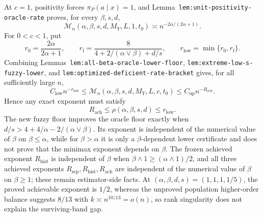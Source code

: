 At \(c=1\), positivity forces \(\pi_P(a\mid x)=1\), and Lemma~\texttt{lem:unit-positivity-oracle-rate} proves, for every \(\beta,s,d\),
\[
\mathcal M_n(\alpha,\beta,s,d,M_Y,L,1,t_0)
\asymp n^{-2\alpha/(2\alpha+1)}.
\]
For \(0<c<1\), put
\[
r_0=\frac{2\alpha}{2\alpha+1},
\qquad
r_{\mathrm f}=\frac{8}{4+2/(\alpha\vee\beta)+d/s},
\qquad
r_{\mathrm{low}}=\min\{r_0,r_{\mathrm f}\}.
\]
Combining Lemmas~\texttt{lem:all-beta-oracle-lower-floor}, \texttt{lem:extreme-low-s-fuzzy-lower}, and \texttt{lem:optimized-deficient-rate-bracket} gives, for all sufficiently large \(n\),
\[
C_{\mathrm{low}}n^{-r_{\mathrm{low}}}
\le
\mathcal M_n(\alpha,\beta,s,d,M_Y,L,c,t_0)
\le
C_{\mathrm{up}}n^{-R_{\mathrm{ach}}}.
\]
Hence any exact exponent must satisfy
\[
R_{\mathrm{ach}}
\le \rho(\alpha,\beta,s,d)
\le r_{\mathrm{low}}.
\]
The new fuzzy floor improves the oracle floor exactly when \(d/s>4+4/\alpha-2/(\alpha\vee\beta)\). Its exponent is independent of the numerical value of \(\beta\) on \(\beta\le\alpha\), while for \(\beta>\alpha\) it is only a \(\beta\)-dependent lower certificate and does not prove that the minimax exponent depends on \(\beta\). The frozen achieved exponent \(R_{\mathrm{hist}}\) is independent of \(\beta\) when \(\beta\wedge1\ge(\alpha\wedge1)/2\), and all three achieved exponents \(R_{\mathrm{sep}},R_{\mathrm{hist}},R_{\mathrm{ach}}\) are independent of the numerical value of \(\beta\) on \(\beta\ge1\); these remain estimator-side facts. At \((\alpha,\beta,d,s)=(1,1,1,1/5)\), the proved achievable exponent is \(1/2\), whereas the unproved population higher-order balance suggests \(8/13\) with \(k\asymp n^{10/13}=o(n)\), so rank singularity does not explain the surviving-band gap.